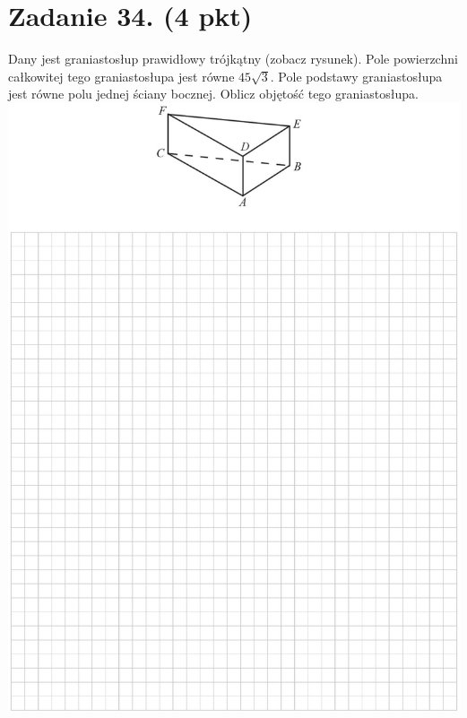 \documentclass[10pt]{article}
\begin{document}
\section*{Zadanie 34. (4 pkt)}
Dany jest graniastosłup prawidłowy trójkątny (zobacz rysunek). Pole powierzchni całkowitej tego graniastosłupa jest równe \(45 \sqrt{3}\). Pole podstawy graniastosłupa jest równe polu jednej ściany bocznej. Oblicz objętość tego graniastosłupa.\\
\includegraphics[max width=\textwidth, center]{2024_11_21_9383c97fb44abf35abe9g-24}\\
\end{document}

